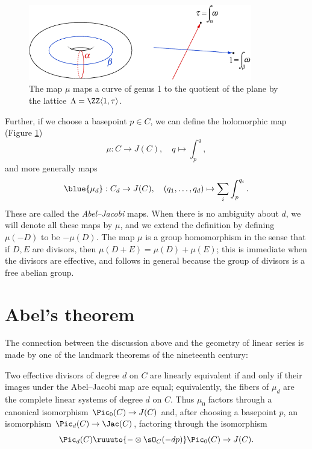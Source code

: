 \begin{figure}
\includegraphics[height=1.3in]{"main/Fig04-3"}
 \caption{The map $\mu$ maps a curve of genus 1 to the quotient of the plane by the lattice $\Lambda = \ZZ\langle 1,\tau\rangle$.}
\label{abeljacobi}
\end{figure}

Further, if we choose a basepoint  $p\in C$, we can define the holomorphic map (Figure \ref{abeljacobi})
%
$$
\mu  :  C  \to  J(C), \quad q\mapsto \int_{p}^{q},
$$
and more generally maps
$$
\blue{\mu_d}
:  C_d  \to  J(C), \quad (q_1,\dots, q_d) \mapsto \sum_i \int_{p}^{q_i}.
$$
These 
are called the \emph{Abel--Jacobi} maps. When there is no
%
ambiguity about $d$, we will denote all these maps  by $\mu$,  and   
we extend the definition by defining $\mu(-D)$ to be $-\mu(D)$.
The map $\mu$ is a group homomorphism in the sense that if $D, E$ are divisors, then
$\mu (D+E) = \mu(D) + \mu(E)$; this is immediate when the divisors are effective, and 
follows in general because the group of divisors is a free abelian group.

\section{Abel's theorem}

The connection between the discussion above and the geometry of linear
series is made by one of the landmark theorems of the nineteenth century: 

\begin{theorem}\label{abel}
Two effective divisors of degree $d$ on $C$  are linearly
%
equivalent if and only if their images under the Abel--Jacobi map are
equal; 
equivalently,
the fibers of $\mu_d$ are
the complete linear systems of degree $d$ on $C$. Thus $\mu_0$ factors
through a canonical isomorphism
$\Pic_0(C) \to J(C)$ and, after choosing a basepoint $p$, an
isomorphism $\Pic_d(C) \to \nobreak\Jac(C)$, factoring through the isomorphism
$$
\Pic_d(C) \ruuuto {-\otimes \sO_C(-dp)} \Pic_0(C) \to J(C).
$$
\end{theorem}

